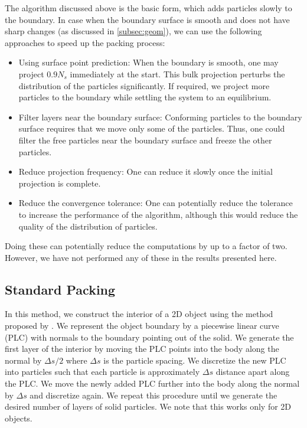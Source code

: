 \documentclass[preprint,12pt]{elsarticle}
\begin{document}
The algorithm discussed above is the basic form, which adds particles slowly
to the boundary. In case when the boundary surface is smooth and does not
have sharp changes (as discussed in \cref{subsec:geom}), we can use the
following approaches to speed up the packing process:
\begin{itemize}
\item Using surface point prediction: When the boundary is smooth, one may
project $0.9 N_{s}$ immediately at the start. This bulk projection perturbs
the distribution of the particles significantly. If required, we project more
particles to the boundary while settling the system to an equilibrium.
\item Filter layers near the boundary surface: Conforming particles to the
  boundary surface requires that we move only some of the particles. Thus,
  one could filter the free particles near the boundary surface and freeze the
  other particles.
\item Reduce projection frequency: One can reduce it slowly once the initial
  projection is complete.
\item Reduce the convergence tolerance: One can potentially reduce the
  tolerance to increase the performance of the algorithm, although this would
  reduce the quality of the distribution of particles.
\end{itemize}
Doing these can potentially reduce the computations by up to a factor of two.
However, we have not performed any of these in the results presented here.

\subsection{Standard Packing}
\label{sec:colla}
In this method, we construct the interior of a 2D object using the method
proposed by \citet{marrone-deltasph:cmame:2011}. We represent the object
boundary by a piecewise linear curve (PLC) with normals to the boundary
pointing out of the solid. We generate the first layer of the interior by
moving the PLC points into the body along the normal by $\Delta s/2$ where
$\Delta s$ is the particle spacing. We discretize the new PLC into particles
such that each particle is approximately $\Delta s$ distance apart along the
PLC. We move the newly added PLC further into the body along the normal by
$\Delta s$ and discretize again. We repeat this procedure until we generate
the desired number of layers of solid particles. We note that this works only
for 2D objects.
\end{document}
